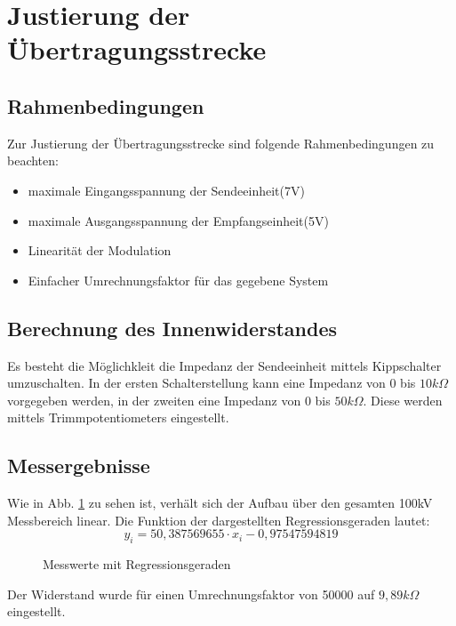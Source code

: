 \section{Justierung der Übertragungsstrecke}
\subsection{Rahmenbedingungen}
Zur Justierung der Übertragungsstrecke sind folgende Rahmenbedingungen zu beachten:
\begin{itemize}
\item maximale Eingangsspannung der Sendeeinheit(7V)
\item maximale Ausgangsspannung der Empfangseinheit(5V)
\item Linearität der Modulation
\item Einfacher Umrechnungsfaktor für das gegebene System
\end{itemize}

\subsection{Berechnung des Innenwiderstandes}
Es besteht die Möglichkleit die Impedanz der Sendeeinheit mittels Kippschalter umzuschalten. In der ersten Schalterstellung kann eine Impedanz von 0 bis $10k\Omega$ vorgegeben werden, in der zweiten eine Impedanz von 0 bis $50k\Omega$. Diese werden mittels Trimmpotentiometers eingestellt. 
\subsection{Messergebnisse}
Wie in Abb. \ref{fig:9k89} zu sehen ist, verhält sich der Aufbau über den gesamten 100kV Messbereich linear. Die Funktion der dargestellten Regressionsgeraden lautet:
\begin{equation}
y_i = 50,387569655 \cdot x_i - 0,97547594819
\label{math:regress100kV}
\end{equation} 
  	\begin{figure}[H]
  	\begin{center}
  	
  	\caption{Messwerte mit Regressionsgeraden\label{fig:9k89}}
		
		\end{center}
	\end{figure}
	Der Widerstand wurde für einen Umrechnungsfaktor von 50000 auf $9,89k\Omega$ eingestellt.
	\begin{figure}[H]
	
	\end{figure}
	
